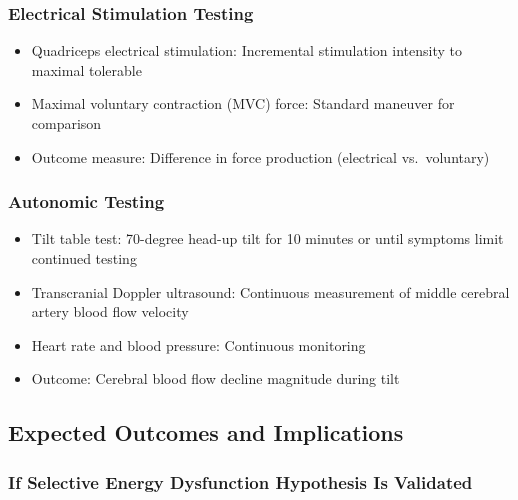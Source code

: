 \subsubsection{Electrical Stimulation Testing}
\begin{itemize}
    \item Quadriceps electrical stimulation: Incremental stimulation intensity to maximal tolerable
    \item Maximal voluntary contraction (MVC) force: Standard maneuver for comparison
    \item Outcome measure: Difference in force production (electrical vs.\ voluntary)
\end{itemize}

\subsubsection{Autonomic Testing}
\begin{itemize}
    \item Tilt table test: 70-degree head-up tilt for 10 minutes or until symptoms limit continued testing
    \item Transcranial Doppler ultrasound: Continuous measurement of middle cerebral artery blood flow velocity
    \item Heart rate and blood pressure: Continuous monitoring
    \item Outcome: Cerebral blood flow decline magnitude during tilt
\end{itemize}

\subsection{Expected Outcomes and Implications}

\subsubsection{If Selective Energy Dysfunction Hypothesis Is Validated}

